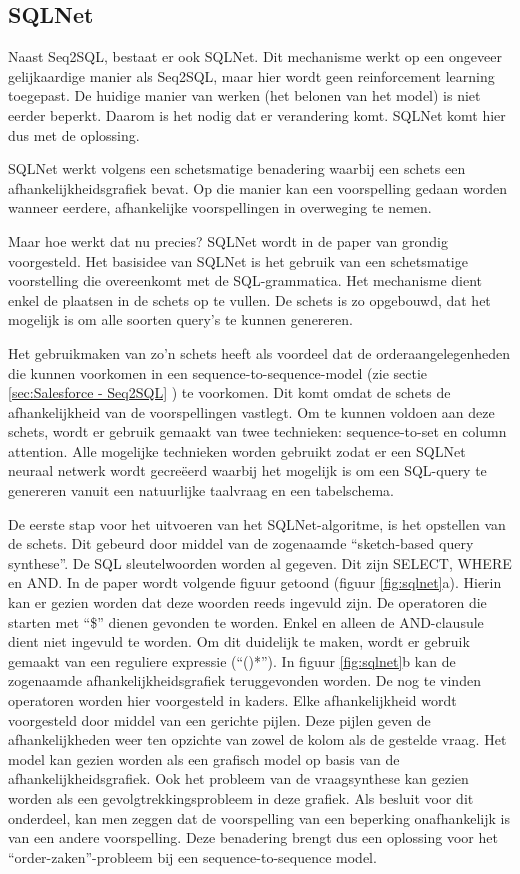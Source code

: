 \subsection{SQLNet}
\label{sec:SQLNet}

Naast Seq2SQL, bestaat er ook SQLNet. Dit mechanisme werkt op een ongeveer gelijkaardige manier als Seq2SQL, maar hier wordt geen reinforcement learning toegepast. De huidige manier van werken (het belonen van het model) is niet eerder beperkt. Daarom is het nodig dat er verandering komt. SQLNet komt hier dus met de oplossing.

SQLNet werkt volgens een schetsmatige benadering waarbij een schets een afhankelijkheidsgrafiek bevat. Op die manier kan een voorspelling gedaan worden wanneer eerdere, afhankelijke voorspellingen in overweging te nemen. 

Maar hoe werkt dat nu precies? SQLNet wordt in de paper van \textcite{sqlnetPaper} grondig voorgesteld. Het basisidee van SQLNet is het gebruik van een schetsmatige voorstelling die overeenkomt met de SQL-grammatica. Het mechanisme dient enkel de plaatsen in de schets op te vullen. De schets is zo opgebouwd, dat het mogelijk is om alle soorten query’s te kunnen genereren.

Het gebruikmaken van zo’n schets heeft als voordeel dat de orderaangelegenheden die kunnen voorkomen in een sequence-to-sequence-model (zie  sectie \ref{sec:Salesforce - Seq2SQL} ) te voorkomen. Dit komt omdat de schets de afhankelijkheid van de voorspellingen vastlegt. Om te kunnen voldoen aan deze schets, wordt er gebruik gemaakt van twee technieken: sequence-to-set en column attention. Alle mogelijke technieken worden gebruikt zodat er een SQLNet neuraal netwerk wordt gecreëerd waarbij het mogelijk is om een SQL-query te genereren vanuit een natuurlijke taalvraag en een tabelschema.

De eerste stap voor het uitvoeren van het SQLNet-algoritme, is het opstellen van de schets. Dit gebeurd door middel van de zogenaamde “sketch-based query synthese”. De SQL sleutelwoorden worden al gegeven. Dit zijn SELECT, WHERE en AND. In de paper wordt volgende figuur getoond (figuur \ref{fig:sqlnet}a). Hierin kan er gezien worden dat deze woorden reeds ingevuld zijn. De operatoren die starten met “\$” dienen gevonden te worden. Enkel en alleen de AND-clausule dient niet ingevuld te worden. Om dit duidelijk te maken, wordt er gebruik gemaakt van een reguliere expressie (“()*”). In figuur \ref{fig:sqlnet}b kan de zogenaamde afhankelijkheidsgrafiek teruggevonden worden. De nog te vinden operatoren worden hier voorgesteld in kaders. Elke afhankelijkheid wordt voorgesteld door middel van een gerichte pijlen. Deze pijlen geven de afhankelijkheden weer ten opzichte van zowel de kolom als de gestelde vraag. Het model kan gezien worden als een grafisch model op basis van de afhankelijkheidsgrafiek. Ook het probleem van de vraagsynthese kan gezien worden als een gevolgtrekkingsprobleem in deze grafiek. Als besluit voor dit onderdeel, kan men zeggen dat de voorspelling van een beperking onafhankelijk is van een andere voorspelling. Deze benadering brengt dus een oplossing voor het “order-zaken”-probleem bij een sequence-to-sequence model.

